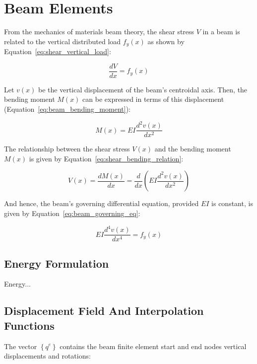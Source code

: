 \section{Beam Elements}
\label{sec:beams}

From the mechanics of materials beam theory, the shear stress $V$ in a beam is related to the vertical distributed load $f_y(x)$ as shown by Equation~\ref{eq:shear_vertical_load}:

\begin{equation}
  \label{eq:shear_vertical_load}
  \frac{dV}{dx} = f_y(x)
\end{equation}

Let $v(x)$ be the vertical displacement of the beam's centroidal axis.
Then, the bending moment $M(x)$ can be expressed in terms of this displacement (Equation~\ref{eq:beam_bending_moment}):

\begin{equation}
  \label{eq:beam_bending_moment}
  M(x) = E I \frac{d^2v(x)}{dx^2}
\end{equation}

The relationship between the shear stress $V(x)$ and the bending moment $M(x)$ is given by Equation~\ref{eq:shear_bending_relation}:

\begin{equation}
  \label{eq:shear_bending_relation}
  V(x) = \frac{dM(x)}{dx} = \frac{d}{dx} \left( E I \frac{d^2v(x)}{dx^2} \right)
\end{equation}

And hence, the beam's governing differential equation, provided $EI$ is constant, is given by Equation~\ref{eq:beam_governing_eq}:

\begin{equation}
  \label{eq:beam_governing_eq}
  E I \frac{d^4v(x)}{dx^4} = f_y(x)
\end{equation}


\subsection{Energy Formulation}

Energy...


\subsection{Displacement Field And Interpolation Functions}

The vector $\left\{ q^e \right\}$ contains the beam finite element start and end nodes vertical displacements and rotations:

